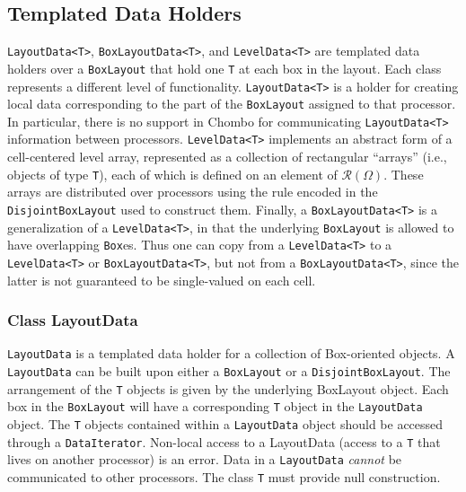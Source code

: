 \subsection{Templated Data Holders}
\label{DataHolderSection}

\verb/LayoutData<T>/, \verb/BoxLayoutData<T>/, and \verb/LevelData<T>/
are templated data holders over a {\tt BoxLayout} that hold one {\tt T}
at each box in the layout. Each class represents a different level of
functionality. {\tt LayoutData<T>} is a holder for creating local data
corresponding to the part of the {\tt BoxLayout} assigned to that
processor. In particular, there is no support in Chombo for
communicating {\tt LayoutData<T>} information between processors. 
{\tt LevelData<T>} implements an abstract form of a cell-centered level
array, represented as a collection of 
rectangular ``arrays'' (i.e., objects of type 
{\tt T}),  each of which is defined on an element of $\mathcal{R}(\Omega)$.
These arrays are distributed over processors using the rule encoded in
the {\tt DisjointBoxLayout} used to construct them.
Finally, a {\tt BoxLayoutData<T>} is a generalization of a 
{\tt LevelData<T>}, in that the underlying {\tt BoxLayout} is allowed
to have overlapping {\tt Box}es. Thus one can copy from a {\tt LevelData<T>}
to a {\tt LevelData<T>} or {\tt BoxLayoutData<T>},
but not from a {\tt BoxLayoutData<T>}, since the latter is not
guaranteed to be single-valued on each cell.

\subsubsection{Class LayoutData}
\label{LayoutDataSection}

{\tt LayoutData} is a templated data holder for
a collection of Box-oriented objects.  
A {\tt LayoutData} can be built upon either a {\tt BoxLayout}
or a {\tt DisjointBoxLayout}.
The arrangement
of the \verb/T/ objects is given by the underlying BoxLayout object.
Each box in the {\tt BoxLayout} will have a corresponding {\tt T}
object in the {\tt LayoutData} object.  The {\tt T} objects 
contained within a {\tt LayoutData} object should be accessed
through a {\tt DataIterator}.   
Non-local access to a LayoutData (access to a {\tt T}
that lives on another processor) is an error.
Data in a {\tt LayoutData} {\it cannot} be communicated to other
processors.
The class \verb/T/ must provide null construction.

